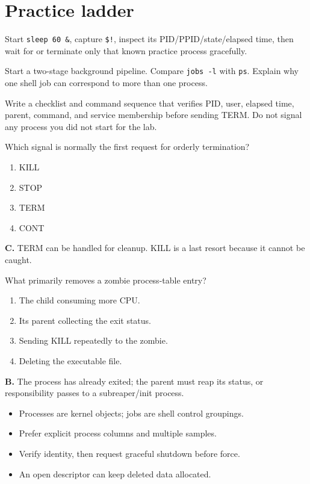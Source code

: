 \documentclass[11pt,oneside,openany]{book}
\newcommand{\fourchoices}[4]{%
  \begin{enumerate}[label=\Alph*),leftmargin=2em,itemsep=0.25em]
    \item #1
    \item #2
    \item #3
    \item #4
  \end{enumerate}}
\begin{document}
\section{Practice ladder}
\begin{practicebox}[title={Easy -- process portrait}]
Start \texttt{sleep 60 \&}, capture \texttt{\$!}, inspect its PID/PPID/state/elapsed time, then wait for or terminate only that known practice process gracefully.
\end{practicebox}
\begin{practicebox}[title={Medium -- jobs versus processes}]
Start a two-stage background pipeline. Compare \texttt{jobs -l} with \texttt{ps}. Explain why one shell job can correspond to more than one process.
\end{practicebox}
\begin{practicebox}[title={Hard -- evidence before signal}]
Write a checklist and command sequence that verifies PID, user, elapsed time, parent, command, and service membership before sending TERM. Do not signal any process you did not start for the lab.
\end{practicebox}

\begin{questionbox}[title={Medium 13.1 -- Graceful termination}]
Which signal is normally the first request for orderly termination?
\fourchoices{KILL}{STOP}{TERM}{CONT}
\end{questionbox}
\begin{answerbox}
\textbf{C.} TERM can be handled for cleanup. KILL is a last resort because it cannot be caught.
\end{answerbox}

\begin{questionbox}[title={Hard 13.2 -- Zombie state}]
What primarily removes a zombie process-table entry?
\fourchoices{The child consuming more CPU.}{Its parent collecting the exit status.}{Sending KILL repeatedly to the zombie.}{Deleting the executable file.}
\end{questionbox}
\begin{answerbox}
\textbf{B.} The process has already exited; the parent must reap its status, or responsibility passes to a subreaper/init process.
\end{answerbox}

\begin{recapbox}
\begin{itemize}
  \item Processes are kernel objects; jobs are shell control groupings.
  \item Prefer explicit process columns and multiple samples.
  \item Verify identity, then request graceful shutdown before force.
  \item An open descriptor can keep deleted data allocated.
\end{itemize}
\end{recapbox}
\end{document}
